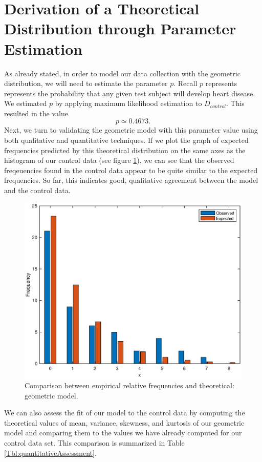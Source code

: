 \documentclass{amsart}
\begin{document}
\section{Derivation of a Theoretical Distribution through Parameter Estimation}
As already stated, in order to model our data collection with the geometric distribution, we will need to estimate the parameter $p$. Recall $p$ represents represents the probability that any given test subject will develop heart disease. We estimated $p$ by applying maximum likelihood estimation to $D_{control}$. This resulted in the value
\[
p\simeq 0.4673.
\]
Next, we turn to validating the geometric model with this parameter value using both qualitative and quantitative techniques. If we plot the graph of expected frequencies predicted by this theoretical distribution on the same axes as the histogram of our control data (see figure \ref{F:graphicalAssessement}), we can see that the observed freqeuencies found in the control data appear to be quite similar to the expected frequencies. So far, this indicates good, qualitative agreement between the model and the control data.
\begin{figure}
\centering
\includegraphics[scale=0.55]{histvalidationfinal}
\caption{
Comparison between empirical relative frequencies and theoretical: geometric model.\label{F:graphicalAssessement}}
\end{figure}
We can also assess the fit of our model to the control data by computing the theoretical values of mean, variance, skewness, and kurtosis of our geometric model and comparing them to the values we have already computed for our control data set. This comparison is summarized in Table \ref{Tbl:quantitativeAssessment}.
\end{document}
